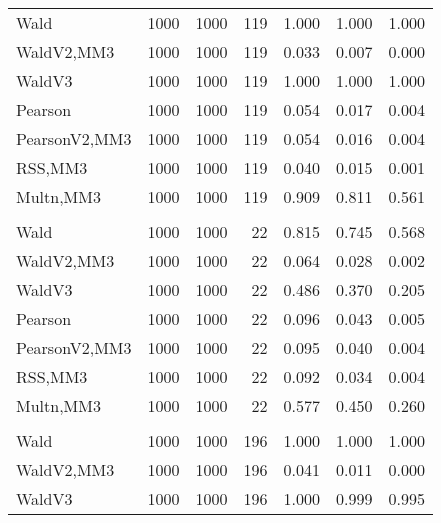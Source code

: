 \documentclass[
]{article}
\begin{document}
\begin{table}[H]
{\begin{tabular}[t]{lrrrrrr}
\hspace{1em}Wald & 1000 & 1000 & 119 & 1.000 & 1.000 & 1.000\\
\hspace{1em}WaldV2,MM3 & 1000 & 1000 & 119 & 0.033 & 0.007 & 0.000\\
\hspace{1em}WaldV3 & 1000 & 1000 & 119 & 1.000 & 1.000 & 1.000\\
\hspace{1em}Pearson & 1000 & 1000 & 119 & 0.054 & 0.017 & 0.004\\
\hspace{1em}PearsonV2,MM3 & 1000 & 1000 & 119 & 0.054 & 0.016 & 0.004\\
\hspace{1em}RSS,MM3 & 1000 & 1000 & 119 & 0.040 & 0.015 & 0.001\\
\hspace{1em}Multn,MM3 & 1000 & 1000 & 119 & 0.909 & 0.811 & 0.561\\
\addlinespace[0.3em]
\multicolumn{7}{l}{\textbf{2F 10V}}\\
\hspace{1em}Wald & 1000 & 1000 & 22 & 0.815 & 0.745 & 0.568\\
\hspace{1em}WaldV2,MM3 & 1000 & 1000 & 22 & 0.064 & 0.028 & 0.002\\
\hspace{1em}WaldV3 & 1000 & 1000 & 22 & 0.486 & 0.370 & 0.205\\
\hspace{1em}Pearson & 1000 & 1000 & 22 & 0.096 & 0.043 & 0.005\\
\hspace{1em}PearsonV2,MM3 & 1000 & 1000 & 22 & 0.095 & 0.040 & 0.004\\
\hspace{1em}RSS,MM3 & 1000 & 1000 & 22 & 0.092 & 0.034 & 0.004\\
\hspace{1em}Multn,MM3 & 1000 & 1000 & 22 & 0.577 & 0.450 & 0.260\\
\addlinespace[0.3em]
\multicolumn{7}{l}{\textbf{3F 15V}}\\
\hspace{1em}Wald & 1000 & 1000 & 196 & 1.000 & 1.000 & 1.000\\
\hspace{1em}WaldV2,MM3 & 1000 & 1000 & 196 & 0.041 & 0.011 & 0.000\\
\hspace{1em}WaldV3 & 1000 & 1000 & 196 & 1.000 & 0.999 & 0.995\\

\end{tabular}}
\end{table}
\end{document}
